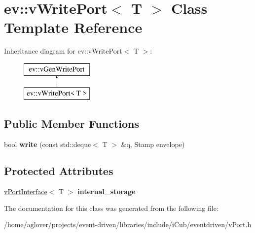 \hypertarget{classev_1_1vWritePort}{}\section{ev\+:\+:v\+Write\+Port$<$ T $>$ Class Template Reference}
\label{classev_1_1vWritePort}
Inheritance diagram for ev\+:\+:v\+Write\+Port$<$ T $>$\+:\begin{figure}[H]
\begin{center}
\leavevmode
\includegraphics[height=2.000000cm]{classev_1_1vWritePort}
\end{center}
\end{figure}
\subsection*{Public Member Functions}
\begin{DoxyCompactItemize}
\item 
bool {\bfseries write} (const std\+::deque$<$ T $>$ \&q, Stamp envelope)\hypertarget{classev_1_1vWritePort_a85492018e79996c93e5e36212725eb2e}{}\label{classev_1_1vWritePort_a85492018e79996c93e5e36212725eb2e}

\end{DoxyCompactItemize}
\subsection*{Protected Attributes}
\begin{DoxyCompactItemize}
\item 
\hyperlink{classev_1_1vPortInterface}{v\+Port\+Interface}$<$ T $>$ {\bfseries internal\+\_\+storage}\hypertarget{classev_1_1vWritePort_a67a8bf076f529bd3dcdb3762769d9327}{}\label{classev_1_1vWritePort_a67a8bf076f529bd3dcdb3762769d9327}

\end{DoxyCompactItemize}


The documentation for this class was generated from the following file\+:\begin{DoxyCompactItemize}
\item 
/home/aglover/projects/event-\/driven/libraries/include/i\+Cub/eventdriven/v\+Port.\+h\end{DoxyCompactItemize}
